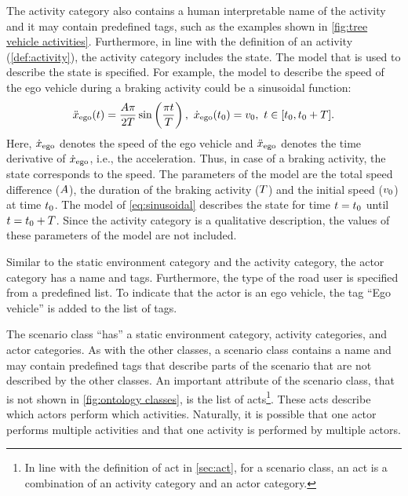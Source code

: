 \cbstart
The activity category also contains a human interpretable name of the activity and it may contain predefined tags, such as the examples shown in \cref{fig:tree vehicle activities}. Furthermore, in line with the definition of an activity (\cref{def:activity}), the activity category includes the state.  The model that is used to describe the state is specified. For example, the model to describe the speed of the ego vehicle during a braking activity could be a sinusoidal function:
\cbstartc
\begin{equation} \label{eq:sinusoidal}
	\ddot{x}_{\mathrm{ego}}(t) = \frac{A \pi}{2T} \sin \left( \frac{\pi t}{T} \right),\ \dot{x}_{\mathrm{ego}}(t_{0}) = v_{0},\ t \in [t_{0}, t_{0}+T].
\end{equation}
Here, $\dot{x}_{\mathrm{ego}}$ denotes the speed of the ego vehicle and $\ddot{x}_{\mathrm{ego}}$ denotes the time derivative of $\dot{x}_{\mathrm{ego}}$, i.e., the acceleration. Thus, in case of a braking activity, the state corresponds to the speed. 
The parameters of the model are the total speed difference ($A$), the duration of the braking activity ($T$) and the initial speed ($v_{0}$) at time $t_{0}$. 
\cbstart
The model of \cref{eq:sinusoidal} describes the state for time $t=t_{0}$ until $t=t_{0}+T$. Since the activity category is a qualitative description, the values of these parameters of the model are not included.
\cbend

Similar to the static environment category and the activity category, the actor category has a name and tags. Furthermore, the type of the road user is specified from a predefined list. To indicate that the actor is an ego vehicle, the tag ``Ego vehicle'' is added to the list of tags.

The scenario class ``has'' a static environment category, activity categories, and actor categories. As with the other classes, a scenario class contains a name and may contain predefined tags that describe parts of the scenario that are not described by the other classes. An important attribute of the scenario class, that is not shown in \cref{fig:ontology classes}, is the list of acts\cbstart\footnote{\cbstartc In line with the definition of act in \cref{sec:act}, for a scenario class, an act is a combination of an activity category and an actor category.\cbend}\cbend. These acts describe which actors perform which activities. Naturally, it is possible that one actor performs multiple activities and that one activity is performed by multiple actors.

